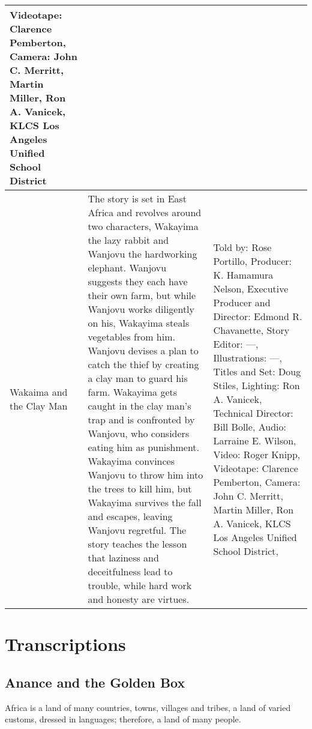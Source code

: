 \begin{table}[h]
\begin{small}
\begin{tabular}{|p{1.5cm}|p{8.5cm}|p{7cm}|}
            Videotape: Clarence Pemberton,
            Camera: John C. Merritt, Martin Miller, Ron A. Vanicek,
            KLCS Los Angeles Unified School District
            \\
            \hline
            Wakaima and the Clay Man
                                 &
            The story is set in East Africa and revolves around two characters, Wakayima the lazy rabbit and Wanjovu the hardworking elephant.
            Wanjovu suggests they each have their own farm, but while Wanjovu works diligently on his, Wakayima steals vegetables from him.
            Wanjovu devises a plan to catch the thief by creating a clay man to guard his farm.
            Wakayima gets caught in the clay man's trap and is confronted by Wanjovu, who considers eating him as punishment.
            Wakayima convinces Wanjovu to throw him into the trees to kill him, but Wakayima survives the fall and escapes, leaving Wanjovu regretful.
            The story teaches the lesson that laziness and deceitfulness lead to trouble, while hard work and honesty are virtues.
                                 &
            Told by: Rose Portillo,
            Producer: K. Hamamura Nelson,
            Executive Producer and Director: Edmond R. Chavanette,
            Story Editor: ---,
            Illustrations: ---,
            Titles and Set: Doug Stiles,
            Lighting: Ron A. Vanicek,
            Technical Director: Bill Bolle,
            Audio: Larraine E. Wilson,
            Video: Roger Knipp,
            Videotape: Clarence Pemberton,
            Camera: John C. Merritt, Martin Miller, Ron A. Vanicek,
            KLCS Los Angeles Unified School District,
            \\
            \hline
        \end{tabular}
    \end{small}

\end{table}

\clearpage
\newpage

\section{Transcriptions}

\subsection{Anance and the Golden Box}

Africa is a land of many countries, towns, villages and tribes, a land of varied customs, dressed in languages; therefore, a land of many people.

